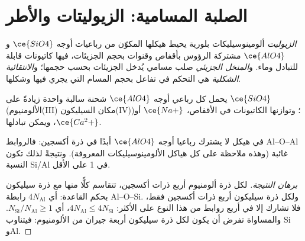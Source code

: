 \section{الصلبة المسامية: الزيوليتات والأطر}

\begin{definition}[الزيوليتات]\label{def:b3:inorganic-materials:zeolite}
\emph{الزيوليت} ألومينوسيليكات بلورية يحيط
هيكلها المكوّن من رباعيات أوجه $\ce{SiO4}$ و$\ce{AlO4}$ مشتركة الرؤوس بأقفاص 
وقنوات بحجم الجزيئات، فيها كاتيونات قابلة للتبادل وماء. 
و\emph{المنخل الجزيئي} صلب مسامي يُدخل
الجزيئات بحسب حجمها؛ و\emph{الانتقائية الشكلية}
هي التحكم في تفاعل بحجم المسام التي يجري فيها وشكلها.
\end{definition}

يحمل كل رباعي أوجه $\ce{AlO4}$ شحنة سالبة واحدة زيادةً على $\ce{SiO4}$
(الألومنيوم(III) مكان السيليكون(IV))؛ وتوازنها الكاتيونات في الأقفاص، $\ce{Na+}$ أو $\ce{Ca^2+}$،
ويمكن تبادلها.

\begin{proposition}\label{prop:b3:inorganic-materials:lowenstein}
في هيكل  لا يشترك رباعيا أوجه $\ce{AlO4}$ أبدًا في ذرة أكسجين: فالروابط Al--O--Al
غائبة (وهذه ملاحظة على كل هياكل الألومينوسيليكات المعروفة). 
ونتيجةً لذلك تكون النسبة Si/Al في  1 على الأقل.
\end{proposition}

\begin{proof}[برهان النتيجة]
لكل ذرة ألومنيوم أربع ذرات أكسجين، تتقاسم كلًّا منها مع ذرة سيليكون بحكم القاعدة:
أي $4N_{\mathrm{Al}}$ رابطة Al--O--Si. ولكل ذرة سيليكون أربع ذرات أكسجين فقط، فلا تشارك إلا في
أربع روابط من هذا النوع على الأكثر: $4N_{\mathrm{Al}} \le 4N_{\mathrm{Si}}$، أي $N_{\mathrm{Si}}/N_{\mathrm{Al}} \ge 1$. والمساواة تفرض أن يكون لكل
ذرة سيليكون أربعة جيران من الألومنيوم: فيتناوب Si وAl.
\end{proof}

